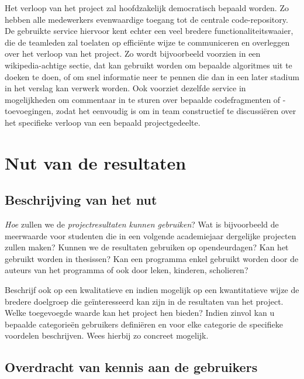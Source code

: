 \documentclass[]{book}
\begin{document}
Het verloop van het project zal hoofdzakelijk democratisch bepaald worden. Zo hebben alle medewerkers evenwaardige toegang tot de centrale code-repository. De gebruikte service hiervoor kent echter een veel bredere functionaliteitswaaier, die de teamleden zal toelaten op efficiënte wijze te communiceren en overleggen over het verloop van het project. Zo wordt bijvoorbeeld voorzien in een wikipedia-achtige sectie, dat kan gebruikt worden om bepaalde algoritmes uit te doeken te doen, of om snel informatie neer te pennen die dan in een later stadium in het verslag kan verwerk worden. Ook voorziet dezelfde service in mogelijkheden om commentaar in te sturen over bepaalde codefragmenten of -toevoegingen, zodat het eenvoudig is om in team constructief te discussiëren over het specifieke verloop van een bepaald projectgedeelte.


\section{Nut van de resultaten}\label{sec:Nut}

\subsection{Beschrijving van het nut}\label{sec:BeschrijvingNut}

\emph{Hoe} zullen we de \emph{projectresultaten kunnen gebruiken}? Wat is bijvoorbeeld de meerwaarde voor studenten die in een volgende academiejaar dergelijke projecten zullen maken? Kunnen we de resultaten gebruiken op opendeurdagen? Kan het gebruikt worden in thesissen? Kan een programma enkel gebruikt worden door de auteurs van het programma of ook door leken, kinderen, scholieren?

Beschrijf  ook op een kwalitatieve en indien mogelijk op een kwantitatieve wijze de bredere doelgroep die geïnteresseerd kan zijn in de resultaten van het project. Welke toegevoegde waarde kan het project hen bieden?  Indien zinvol kan u bepaalde categorieën gebruikers definiëren en voor elke categorie de specifieke voordelen beschrijven. Wees hierbij zo concreet mogelijk. 

\subsection{Overdracht van kennis aan de gebruikers}\label{sec:Overdracht}

\end{document}
